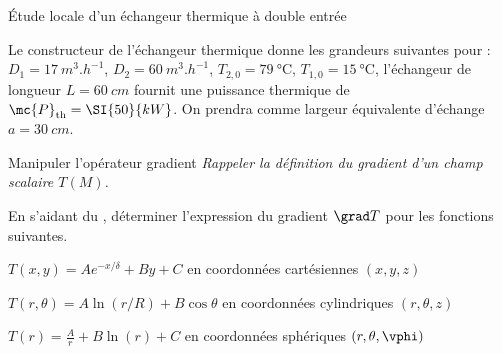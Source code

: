 \begin{exo}[PC][1][colle]{Étude locale d’un échangeur thermique à double entrée}
\begin{quest}
\end{quest} 

Le constructeur de l'échangeur thermique donne les grandeurs suivantes pour : $D_1=\SI{17}{m^3.h^{-1}}$, $D_2 = \SI{60}{m^3.h^{-1}}$, $T_{2,0}=\SI{79}{\celsius}$,
$T_{1,0}=\SI{15}{\celsius}$, l'échangeur de longueur $L=\SI{60}{cm}$ fournit une puissance thermique de $\mc{P}_{\rm th}=\SI{50}{kW}$.
On prendra comme largeur équivalente d'échange $a=\SI{30}{cm}$.
\begin{quest}
\end{quest}
\end{exo}

\begin{exo}[PC][1][appli]{Manipuler l'opérateur gradient}
  \emph{Rappeler la définition du gradient d'un champ scalaire $T(M)$.}
  \hauteurLargeurCadreReponse		{9mm}{5.5cm}


En s'aidant du , déterminer l'expression du gradient $\grad T$ pour les fonctions suivantes.

\begin{enonce}
  $T(x,y)=Ae^{-x/\delta} + By + C$ en coordonnées cartésiennes $(x,y,z)$
\end{enonce}


\begin{enonce}
  $T(r,\theta)=A \ln(r/R) + B\cos \theta$ en coordonnées cylindriques $(r,\theta,z)$
\end{enonce}


\begin{enonce}
 $T(r)=\frac{A}{r}+B \ln(r) + C$ en coordonnées sphériques $(r,\theta,\vphi)$
\end{enonce}


\end{exo}

